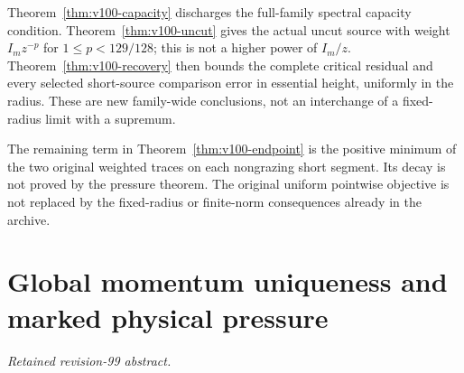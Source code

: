 \documentclass[11pt,reqno]{amsart}
\numberwithin{equation}{section}
\theoremstyle{definition}\newtheorem{definition}[theorem]{Definition}
\theoremstyle{remark}\newtheorem{remark}[theorem]{Remark}
\theoremstyle{definition}\newtheorem{inputstatement}[theorem]{Input statement}
\begin{document}
Theorem~\ref{thm:v100-capacity} discharges the full-family spectral
capacity condition. Theorem~\ref{thm:v100-uncut} gives the actual
uncut source with weight $I_mz^{-p}$ for $1\le p<129/128$; this is
not a higher power of $I_m/z$. Theorem~\ref{thm:v100-recovery} then
bounds the complete critical residual and every selected short-source
comparison error in essential height, uniformly in the radius.
These are new family-wide conclusions, not an interchange of a
fixed-radius limit with a supremum.

The remaining term in Theorem~\ref{thm:v100-endpoint} is the positive
minimum of the two original weighted traces on each nongrazing short
segment. Its decay is not proved by the pressure theorem. The original
uniform pointwise objective is not replaced by the fixed-radius or
finite-norm consequences already in the archive.















\appendix


\endgroup
\part{Global momentum uniqueness and marked physical pressure}
\begingroup
\let\ArchiveLabel\label
\let\ArchiveRef\ref
\renewcommand{\label}[1]{\ArchiveLabel{v99archive:#1}}
\renewcommand{\ref}[1]{%
  \IfBeginWith{#1}{supp-}{%
    \StrBehind{#1}{supp-}[\ArchiveTarget]%
    \ArchiveRef{\ArchiveTarget}%
  }{\ArchiveRef{v99archive:#1}}%
}
\makeatletter
\let\ltx@label\label
\makeatother
\paragraph{Retained revision-99 abstract.}
\end{document}

